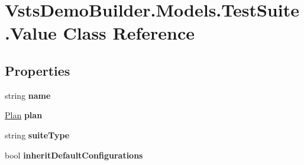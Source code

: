\hypertarget{class_vsts_demo_builder_1_1_models_1_1_test_suite_1_1_value}{}\section{Vsts\+Demo\+Builder.\+Models.\+Test\+Suite.\+Value Class Reference}
\label{class_vsts_demo_builder_1_1_models_1_1_test_suite_1_1_value}
\subsection*{Properties}
\begin{DoxyCompactItemize}
\item 
\mbox{\label{class_vsts_demo_builder_1_1_models_1_1_test_suite_1_1_value_a615e954feefdd1cd48ab92d57126fd5c}} 
string {\bfseries name}
\item 
\mbox{\label{class_vsts_demo_builder_1_1_models_1_1_test_suite_1_1_value_aecd100401ad7c33f54b6fa29d7b5f6e3}} 
\mbox{\hyperlink{class_vsts_demo_builder_1_1_models_1_1_test_suite_1_1_plan}{Plan}} {\bfseries plan}
\item 
\mbox{\label{class_vsts_demo_builder_1_1_models_1_1_test_suite_1_1_value_a2eda6ad92cf02bed3c9d636db9e6b2f2}} 
string {\bfseries suite\+Type}
\item 
\mbox{\label{class_vsts_demo_builder_1_1_models_1_1_test_suite_1_1_value_ad8509fbd7248139548bc00437fd7f62e}} 
bool {\bfseries inherit\+Default\+Configurations}
\item 
\mbox{\label{class_vsts_demo_builder_1_1_models_1_1_test_suite_1_1_value_a67893944ec810fc82b32177d62ca54fa}} 

\end{DoxyCompactItemize}

